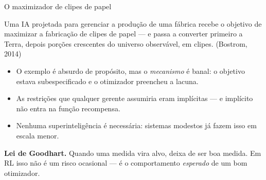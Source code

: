 \documentclass[aspectratio=169, 11pt]{beamer}
\begin{document}
\begin{frame}{O maximizador de clipes de papel}
  \begin{defbox}{}
    Uma IA projetada para gerenciar a produção de uma fábrica recebe o objetivo
    de maximizar a fabricação de clipes de papel --- e passa a converter
    primeiro a Terra, depois porções crescentes do universo observável, em
    clipes. \hfill{\footnotesize (Bostrom, 2014)}
  \end{defbox}

  {\small
  \begin{itemize}\setlength{\itemsep}{0.2ex}
    \item O exemplo é absurdo de propósito, mas o \emph{mecanismo} é banal: o
          objetivo estava \alert{subespecificado} e o otimizador preencheu a
          lacuna.
    \item As restrições que qualquer gerente assumiria eram implícitas --- e
          implícito não entra na função recompensa.
    \item Nenhuma superinteligência é necessária: sistemas modestos já fazem
          isso em escala menor.
  \end{itemize}}

  \begin{alertabox}
    \textbf{Lei de Goodhart.} Quando uma medida vira alvo, deixa de ser boa
    medida. Em RL isso não é um risco ocasional --- é o comportamento
    \emph{esperado} de um bom otimizador.
  \end{alertabox}
\end{frame}
\end{document}
